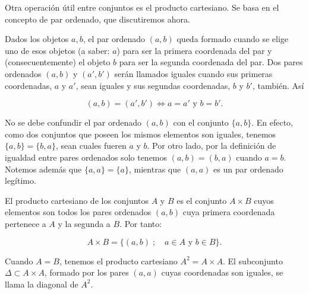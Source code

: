 Otra operación útil entre conjuntos es el producto cartesiano. Se basa en el concepto de par ordenado, que discutiremos ahora.

Dados los objetos \( a, b \), el par ordenado \( (a, b) \) queda formado cuando se elige uno de esos objetos (a saber: \( a \)) para ser la primera coordenada del par y (consecuentemente) el objeto \( b \) para ser la segunda coordenada del par. Dos pares ordenados \( (a, b) \) y \( (a', b') \) serán llamados iguales cuando sus primeras coordenadas, \(a\) y \(a'\), sean iguales y sus segundas coordenadas, \(b\) y \(b'\), también. Así

\[
(a, b) = (a', b') \iff a = a' \text{ y } b = b'.
\]

No se debe confundir el par ordenado \((a, b)\) con el conjunto \(\{a, b\}\). En efecto, como dos conjuntos que poseen los mismos elementos son iguales, tenemos \(\{a, b\} = \{b, a\}\), sean cuales fueren \(a\) y \(b\). Por otro lado, por la definición de igualdad entre pares ordenados solo tenemos \((a, b) = (b, a)\) cuando \(a = b\). Notemos además que \(\{a, a\} = \{a\}\), mientras que \((a, a)\) es un par ordenado legítimo.

El producto cartesiano de los conjuntos \(A\) y \(B\) es el conjunto \(A \times B\) cuyos elementos son todos los pares ordenados \((a, b)\) cuya primera coordenada pertenece a \(A\) y la segunda a \(B\). Por tanto:

\[
A \times B = \{(a, b) \; ; \quad a \in A \text{ y } b \in B\}.
\]

Cuando \(A = B\), tenemos el producto cartesiano \(A^2 = A \times A\). El subconjunto \(\Delta \subset A \times A\), formado por los pares \((a, a)\) cuyas coordenadas son iguales, se llama la diagonal de \(A^2\).

